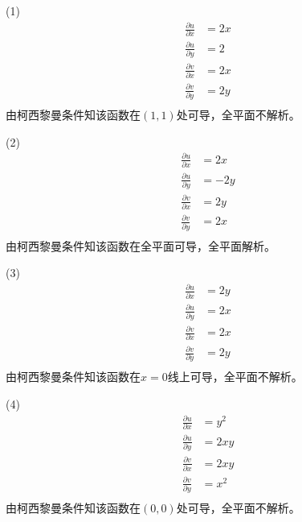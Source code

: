 \documentclass{phyasgn}
\begin{document}
\begin{sol}[1]
   (1)$$\begin{aligned}
    \frac{\partial u}{\partial x}&=2x\\
    \frac{\partial u}{\partial y}&=2\\
    \frac{\partial v}{\partial x}&=2x\\
    \frac{\partial v}{\partial y}&=2y\\
   \end{aligned}$$
   由柯西黎曼条件知该函数在$(1,1)$处可导，全平面不解析。\par
   (2)$$\begin{aligned}
    \frac{\partial u}{\partial x}&=2x\\
    \frac{\partial u}{\partial y}&=-2y\\
    \frac{\partial v}{\partial x}&=2y\\
    \frac{\partial v}{\partial y}&=2x\\
   \end{aligned}$$
   由柯西黎曼条件知该函数在全平面可导，全平面解析。\par
   (3)$$\begin{aligned}
    \frac{\partial u}{\partial x}&=2y\\
    \frac{\partial u}{\partial y}&=2x\\
    \frac{\partial v}{\partial x}&=2x\\
    \frac{\partial v}{\partial y}&=2y\\
   \end{aligned}$$
   由柯西黎曼条件知该函数在$x=0$线上可导，全平面不解析。\par
   (4)$$\begin{aligned}
    \frac{\partial u}{\partial x}&=y^2\\
    \frac{\partial u}{\partial y}&=2xy\\
    \frac{\partial v}{\partial x}&=2xy\\
    \frac{\partial v}{\partial y}&=x^2\\
   \end{aligned}$$
   由柯西黎曼条件知该函数在$(0,0)$处可导，全平面不解析。\par
\end{sol}\par
\end{document}
